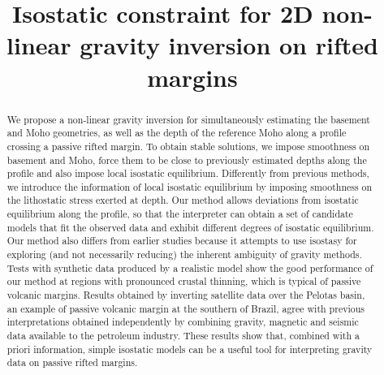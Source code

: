 \documentclass[manuscript,revised]{geophysics}
\begin{document}
\title{Isostatic constraint for 2D non-linear gravity inversion on rifted margins}

\renewcommand{\thefootnote}{\fnsymbol{footnote}} 


%

\maketitle

\begin{abstract}


We propose a non-linear gravity inversion for simultaneously estimating the 
basement and Moho geometries, as well as the depth of the reference Moho 
along a profile crossing a passive rifted margin. To obtain stable solutions, 
we impose smoothness on basement and Moho, force them to be close to previously 
estimated depths along the profile and also impose local isostatic equilibrium. 
Differently from previous methods, we introduce the information of local isostatic 
equilibrium by imposing smoothness on the lithostatic stress exerted at depth. 
Our method allows deviations from isostatic equilibrium along the profile, so that 
the interpreter can obtain a set of candidate models that fit the observed data 
and exhibit different degrees of isostatic equilibrium. 
Our method also differs from earlier studies because it attempts to use 
isostasy for exploring (and not necessarily reducing) the inherent 
ambiguity of gravity methods.
Tests with synthetic data produced by a realistic model show the good performance 
of our method at regions with pronounced crustal thinning, which is typical of 
passive volcanic margins. Results obtained by inverting satellite data over the 
Pelotas basin, an example of passive volcanic margin at the southern of Brazil, 
agree with previous interpretations obtained independently by combining gravity, 
magnetic and seismic data available to the petroleum industry. These results 
show that, combined with a priori information, simple isostatic models can be
a useful tool for interpreting gravity data on passive rifted margins.


\end{abstract}
\end{document}
